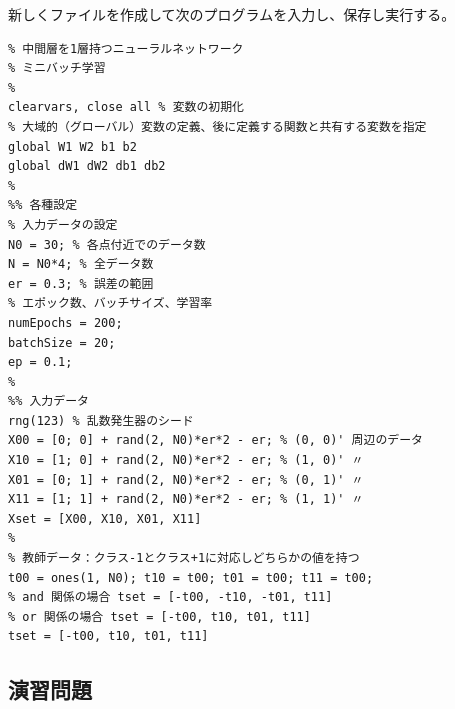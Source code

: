 \documentclass[10pt,a4paper,titlepage]{jreport} %
\begin{document}
新しくファイルを作成して次のプログラムを入力し、保存し実行する。

\begin{lstlisting}[caption=NN]
%%%%% 以下を入力 %%%%%
% 中間層を1層持つニューラルネットワーク
% ミニバッチ学習
%
clearvars, close all % 変数の初期化
% 大域的（グローバル）変数の定義、後に定義する関数と共有する変数を指定
global W1 W2 b1 b2
global dW1 dW2 db1 db2
%
%% 各種設定
% 入力データの設定
N0 = 30; % 各点付近でのデータ数
N = N0*4; % 全データ数
er = 0.3; % 誤差の範囲
% エポック数、バッチサイズ、学習率
numEpochs = 200;
batchSize = 20;
ep = 0.1;
%
%% 入力データ
rng(123) % 乱数発生器のシード
X00 = [0; 0] + rand(2, N0)*er*2 - er; % (0, 0)' 周辺のデータ
X10 = [1; 0] + rand(2, N0)*er*2 - er; % (1, 0)' 〃
X01 = [0; 1] + rand(2, N0)*er*2 - er; % (0, 1)' 〃
X11 = [1; 1] + rand(2, N0)*er*2 - er; % (1, 1)' 〃
Xset = [X00, X10, X01, X11]
%
% 教師データ：クラス-1とクラス+1に対応しどちらかの値を持つ
t00 = ones(1, N0); t10 = t00; t01 = t00; t11 = t00;
% and 関係の場合 tset = [-t00, -t10, -t01, t11]
% or 関係の場合 tset = [-t00, t10, t01, t11]
tset = [-t00, t10, t01, t11]
\end{lstlisting}

\subsection{演習問題}
\end{document}
